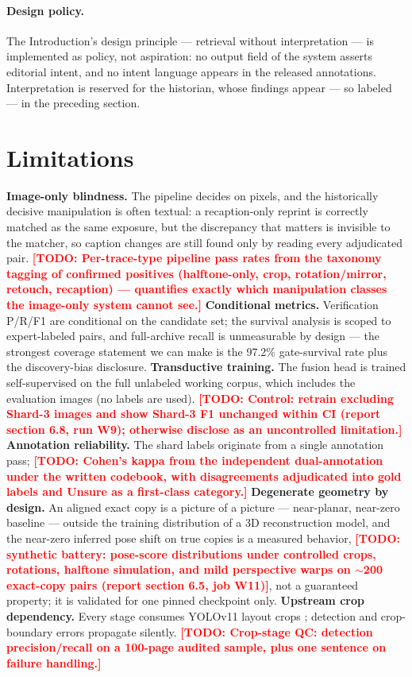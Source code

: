 \documentclass[letterpaper]{article} %
\newcommand{\todo}[1]{\textcolor{red}{\textbf{[TODO: #1]}}}
\begin{document}
\paragraph{Design policy.}
The Introduction's design principle --- retrieval without
interpretation --- is implemented as policy, not aspiration: no output
field of the system asserts editorial intent, and no intent language
appears in the released annotations. Interpretation is reserved for
the historian, whose findings appear --- so labeled --- in the
preceding section.

\section{Limitations}
\label{sec:limitations}

\textbf{Image-only blindness.} The pipeline decides on pixels, and the
historically decisive manipulation is often textual: a recaption-only
reprint is correctly matched as the same exposure, but the discrepancy
that matters is invisible to the matcher, so caption changes are still
found only by reading every adjudicated pair.
\todo{Per-trace-type pipeline pass rates from the taxonomy tagging of
confirmed positives (halftone-only, crop, rotation/mirror, retouch,
recaption) --- quantifies exactly which manipulation classes the
image-only system cannot see.}
\textbf{Conditional metrics.} Verification P/R/F1 are conditional on
the candidate set; the survival analysis is scoped to expert-labeled
pairs, and full-archive recall is unmeasurable by design --- the
strongest coverage statement we can make is the 97.2\% gate-survival
rate plus the discovery-bias disclosure.
\textbf{Transductive training.} The fusion head is trained
self-supervised on the full unlabeled working corpus, which includes
the evaluation images (no labels are used).
\todo{Control: retrain excluding Shard-3 images and show Shard-3 F1
unchanged within CI (report section 6.8, run W9); otherwise disclose as
an uncontrolled limitation.}
\textbf{Annotation reliability.} The shard labels originate from a
single annotation pass;
\todo{Cohen's kappa from the independent dual-annotation under the
written codebook, with disagreements adjudicated into gold labels and
Unsure as a first-class category.}
\textbf{Degenerate geometry by design.} An aligned exact copy is a
picture of a picture --- near-planar, near-zero baseline --- outside
the training distribution of a 3D reconstruction model, and the
near-zero inferred pose shift on true copies is a measured behavior,
\todo{synthetic battery: pose-score distributions under controlled
crops, rotations, halftone simulation, and mild perspective warps on
$\sim$200 exact-copy pairs (report section 6.5, job W11)}, not a
guaranteed property; it is validated for one pinned checkpoint only.
\textbf{Upstream crop dependency.} Every stage consumes YOLOv11 layout
crops \cite{khanam2024yolov11}; detection and crop-boundary errors
propagate silently.
\todo{Crop-stage QC: detection precision/recall on a 100-page audited
sample, plus one sentence on failure handling.}
\end{document}

